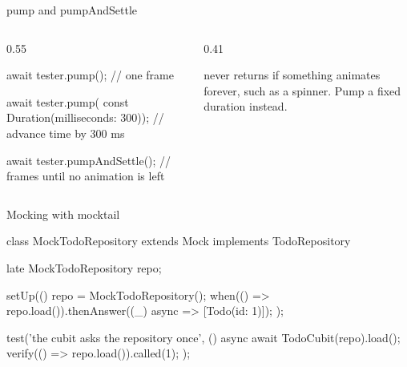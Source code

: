 \documentclass[10pt,aspectratio=169,t]{beamer}
\begin{document}
\begin{frame}[fragile,eyebrow=Testing]{pump and pumpAndSettle}
  \begin{columns}[T]
    \begin{column}{0.55\textwidth}
\begin{dart}
await tester.pump();
// one frame

await tester.pump(
  const Duration(milliseconds: 300));
// advance time by 300 ms

await tester.pumpAndSettle();
// frames until no animation is left
\end{dart}
    \end{column}
    \begin{column}{0.41\textwidth}
      \begin{warning}
         never returns if something animates forever, such as a spinner. Pump a fixed duration instead.
      \end{warning}
    \end{column}
  \end{columns}
\end{frame}

\begin{frame}[fragile,eyebrow=Testing]{Mocking with mocktail}
\begin{dart}
class MockTodoRepository extends Mock implements TodoRepository {}

late MockTodoRepository repo;

setUp(() {
  repo = MockTodoRepository();
  when(() => repo.load()).thenAnswer((_) async => [Todo(id: 1)]);
});

test('the cubit asks the repository once', () async {
  await TodoCubit(repo).load();
  verify(() => repo.load()).called(1);
});
\end{dart}
\end{frame}
\end{document}
